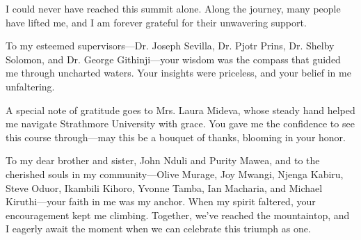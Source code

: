\documentclass[
  11pt,
  oneside,
  english,
  doublespacing,
  headsepline,
]{MastersDoctoralThesis}
\begin{document}
\begin{acknowledgements}
\addchaptertocentry{\acknowledgementname} %

I could never have reached this summit alone.  Along the journey, many people have lifted me, and I am forever grateful for their unwavering support.

To my esteemed supervisors---Dr. Joseph Sevilla, Dr. Pjotr Prins, Dr. Shelby Solomon, and Dr. George Githinji---your wisdom was the compass that guided me through uncharted waters.  Your insights were priceless, and your belief in me unfaltering.

A special note of gratitude goes to Mrs. Laura Mideva, whose steady hand helped me navigate Strathmore University with grace.  You gave me the confidence to see this course through---may this be a bouquet of thanks, blooming in your honor.

To my dear brother and sister, John Nduli and Purity Mawea, and to the cherished souls in my community---Olive Murage, Joy Mwangi, Njenga Kabiru, Steve Oduor, Ikambili Kihoro, Yvonne Tamba, Ian Macharia, and Michael Kiruthi---your faith in me was my anchor. When my spirit faltered, your encouragement kept me climbing. Together, we’ve reached the mountaintop, and I eagerly await the moment when we can celebrate this triumph as one.

\end{acknowledgements}




\tableofcontents
\listoffigures
\listoftables



\end{document}
